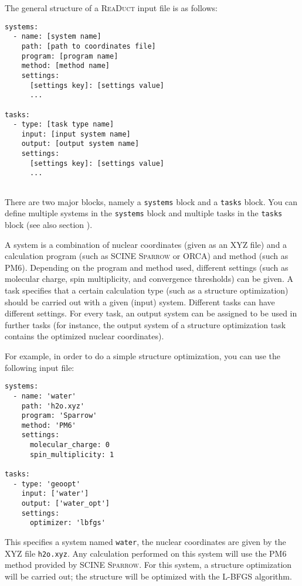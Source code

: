 \documentclass[]{tufte-book}
\begin{document}
The general structure of a \textsc{ReaDuct} input file is as follows:

\begin{verbatim}
systems:
  - name: [system name]
    path: [path to coordinates file]
    program: [program name]
    method: [method name]
    settings:
      [settings key]: [settings value]
      ...

tasks:
  - type: [task type name]
    input: [input system name]
    output: [output system name]
    settings:
      [settings key]: [settings value]
      ...
 
\end{verbatim}

There are two major blocks, namely a \texttt{systems} block and a \texttt{tasks} block. You can define multiple systems
in the \texttt{systems} block and multiple tasks in the \texttt{tasks} block (see also section ).

A system is a combination of nuclear coordinates (given as an XYZ file) and a calculation program (such as SCINE \textsc{Sparrow}
or ORCA) and method (such as PM6). Depending on the program and method used, different settings (such as molecular charge, spin
multiplicity, and convergence thresholds) can be given. A task specifies that a certain calculation type (such as a
structure optimization) should be carried out with a given (input) system. Different tasks can have different settings.
For every task, an output system can be assigned to be used in further tasks (for instance, the output system of a
structure optimization task contains the optimized nuclear coordinates).

For example, in order to do a simple structure optimization, you can use the following input file:

\begin{verbatim}
systems:
  - name: 'water'
    path: 'h2o.xyz'
    program: 'Sparrow'
    method: 'PM6'
    settings:
      molecular_charge: 0
      spin_multiplicity: 1

tasks:
  - type: 'geoopt'
    input: ['water']
    output: ['water_opt']
    settings:
      optimizer: 'lbfgs'
\end{verbatim}

This specifies a system named \texttt{water}, the nuclear coordinates are given by the XYZ file \texttt{h2o.xyz}. Any 
calculation performed on this system will use the PM6 method provided by SCINE \textsc{Sparrow}. For this system, a
structure optimization will be carried out; the structure will be optimized with the L-BFGS algorithm\cite{lbfgs}.
\end{document}
